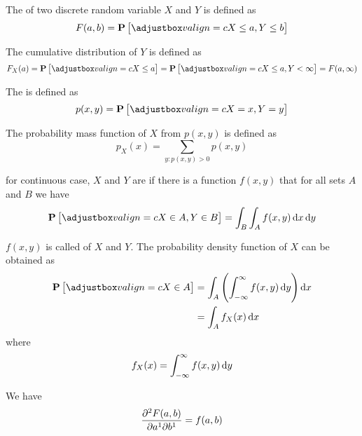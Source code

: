 \begin{definition}
    The  of two discrete random variable $X$ and $Y$ is defined as
    \begin{equation}
        F(a,b) = \probability{ X \leq a, Y \leq b }
    \end{equation}
    
    The cumulative distribution of $Y$ is defined as
    \begin{equation}
        F_X(a) = \probability{X \leq a } =\probability{X \leq a, Y < \infty } = F(a, \infty)
    \end{equation}
    
    The  is defined as 
    \begin{equation}
        p(x,y) =\probability{X = x, Y = y}
    \end{equation}
    
    The probability mass function of $X$ from $p(x,y)$ is defined as
    \begin{equation}
        p_X(x) = \displaystyle \sum_{y: p(x,y) > 0} p(x,y)
    \end{equation}
\end{definition}


\begin{definition}
    for continuous case, $X$ and $Y$ are  if there is a function $f(x,y)$ that for all sets $A$ and $B$ we have 
\begin{equation}
    \probability{X \in A, Y \in B} = \int_B \int_A f(x,y) \dif{x} \dif{y}
\end{equation}

$f(x,y)$ is called  of $X$ and $Y$. The probability density function of $X$ can be obtained as
\begin{equation}
    \begin{aligned}
        \probability{X \in A} &= \int_A \left( \int_{-\infty}^\infty f(x,y) \dif{y} \right) \dif{x}  \\
        &= \int_A f_X (x) \dif{x}
    \end{aligned}
\end{equation}
where
\begin{equation}
     f_X(x) = \int_{-\infty}^\infty f(x,y) \dif{y}
\end{equation}

We have 
\begin{equation}
    \dmd{F(a,b)}{2}{a}{1}{b}{1} = f(a,b)
\end{equation}
\end{definition}

